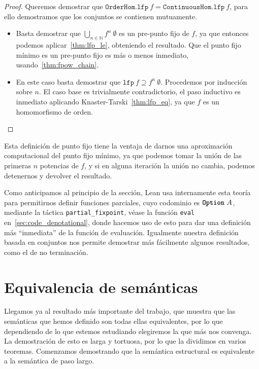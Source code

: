 \documentclass[
  a4paper, 
  10pt, 
  parskip=half, 
  toc=bibliography,
]{scrbook}
\theoremstyle{definition}
\theoremstyle{bolddef}
\newcommand{\funfont}[1]{\texttt{#1}}
\newcommand{\tyfont}[1]{\texttt{\textbf{#1}}}
\begin{document}
\begin{proof}
  Queremos demostrar que \(\funfont{OrderHom.lfp} \ f = \funfont{ContinuousHom.lfp} \ f\),
  para ello demostramos que los conjuntos se contienen mutuamente.
  \begin{itemize}
    \item[(\(\subseteq\))] 
      Basta demostrar que \(\bigcup_{n \in \mathbb{N}} f^n \ \emptyset\)
      es un pre-punto fijo de \(f\), ya que entonces podemos aplicar~\ref{thm:lfp_le},
      obteniendo el resultado. Que el punto fijo mínimo es un pre-punto fijo es más o menos
      inmediato, usando~\ref{thm:fpow_chain}.

    \item[(\(\supseteq\))] 
      En este caso basta demostrar que \(\funfont{lfp} \ f \supseteq f^n \ \emptyset\).
      Procedemos por inducción sobre \(n\). El caso base es trivialmente contradictorio,
      el paso inductivo es inmediato aplicando Knaster-Tarski~\ref{thm:lfp_eq},
      ya que \(f\) es un homomorfismo de orden.
  \end{itemize}
\end{proof}

Esta definición de punto fijo tiene la ventaja de darnos una aproximación
computacional del punto fijo mínimo, ya que podemos tomar la unión de las primeras \(n\)
potencias de \(f\), y si en alguna iteración la unión no cambia, podemos
detenernos y devolver el resultado. 

Como anticipamos al principio de la sección, Lean usa internamente esta 
teoría para permitirnos definir funciones parciales, cuyo codominio es 
\(\tyfont{Option} \ A\), mediante la táctica \texttt{partial\_fixpoint},
véase la función \texttt{eval} en~\ref{sec:code_denotational}, donde
hacemos uso de esto para dar una definición más \enquote{inmediata} de la función de evaluación.
Igualmente nuestra definición basada en conjuntos nos permite demostrar más fácilmente algunos
resultados, como el de no terminación.

\section{Equivalencia de semánticas}\label{sec:equivalence}

Llegamos ya al resultado más importante del trabajo, que muestra que las semánticas que hemos
definido son todas ellas equivalentes, por lo que dependiendo de lo que estemos estudiando
elegiremos la que más nos convenga. La demostración de esto es larga y
tortuosa, por lo que la dividimos en varios teoremas. Comenzamos demostrando
que la semántica estructural es equivalente a la semántica de paso largo.
\end{document}

